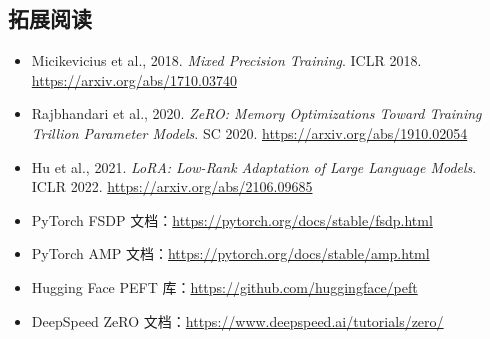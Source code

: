 \subsection{拓展阅读}

\begin{itemize}
    \item Micikevicius et al., 2018. \textit{Mixed Precision Training}. ICLR 2018. \url{https://arxiv.org/abs/1710.03740}
    \item Rajbhandari et al., 2020. \textit{ZeRO: Memory Optimizations Toward Training Trillion Parameter Models}. SC 2020. \url{https://arxiv.org/abs/1910.02054}
    \item Hu et al., 2021. \textit{LoRA: Low-Rank Adaptation of Large Language Models}. ICLR 2022. \url{https://arxiv.org/abs/2106.09685}
    \item PyTorch FSDP 文档：\url{https://pytorch.org/docs/stable/fsdp.html}
    \item PyTorch AMP 文档：\url{https://pytorch.org/docs/stable/amp.html}
    \item Hugging Face PEFT 库：\url{https://github.com/huggingface/peft}
    \item DeepSpeed ZeRO 文档：\url{https://www.deepspeed.ai/tutorials/zero/}
\end{itemize}


